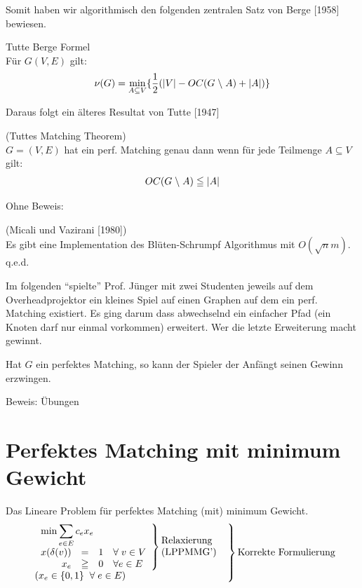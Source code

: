 Somit haben wir algorithmisch den folgenden zentralen Satz von Berge [1958]
bewiesen.
\begin{satz}
Tutte Berge Formel\\
Für $G(V,E)$ gilt:
\[
\nu(G) = \min_{A \subseteq V} \{\frac{1}{2}(|V| -OC(G\;\backslash\; A) + |A|)
\}\]
\end{satz} 
Daraus folgt ein älteres Resultat von Tutte [1947]
\begin{korollar}
(Tuttes Matching Theorem)\\
$G=(V,E)$ hat ein perf. Matching genau dann wenn für jede Teilmenge $A
\subseteq V$ gilt:
\[OC(G\;\backslash\; A) \leqq |A|\]
\end{korollar}
Ohne Beweis:
\begin{satz}
(Micali und Vazirani [1980])\\
Es gibt eine Implementation des Blüten-Schrumpf Algorithmus mit
$O(\sqrt{n}m)$. q.e.d.
\end{satz}

Im folgenden "`spielte"' Prof. Jünger mit zwei Studenten jeweils auf dem
Overheadprojektor ein kleines Spiel auf einen Graphen auf dem ein perf.
Matching existiert. Es ging darum dass abwechselnd ein einfacher Pfad (ein
Knoten darf nur einmal vorkommen)
erweitert. Wer die letzte Erweiterung macht gewinnt.

\begin{satz}
Hat $G$ ein perfektes Matching, so kann der Spieler der Anfängt seinen
Gewinn erzwingen.
\end{satz}
Beweis: Übungen

\section{Perfektes Matching mit minimum Gewicht}

Das Lineare Problem für perfektes Matching (mit) minimum Gewicht.
\[
\left. \begin{array}{l} \left. \begin{array}{rcll}
\multicolumn{3}{l}{\min \displaystyle \sum_{e \in E} c_e x_e}\\
x(\delta(v)) &=&1 & \forall \; v \in V\\
x_e &\geqq& 0& \forall e \in E \end{array} \right\}
\parbox{2.2cm}{Relaxierung\\ 
(LPPMMG')}\\
(x_e \in \{0,1\} \; \; \forall \; e \in E)
\end{array} \right\} \mbox{Korrekte Formulierung}
\]

